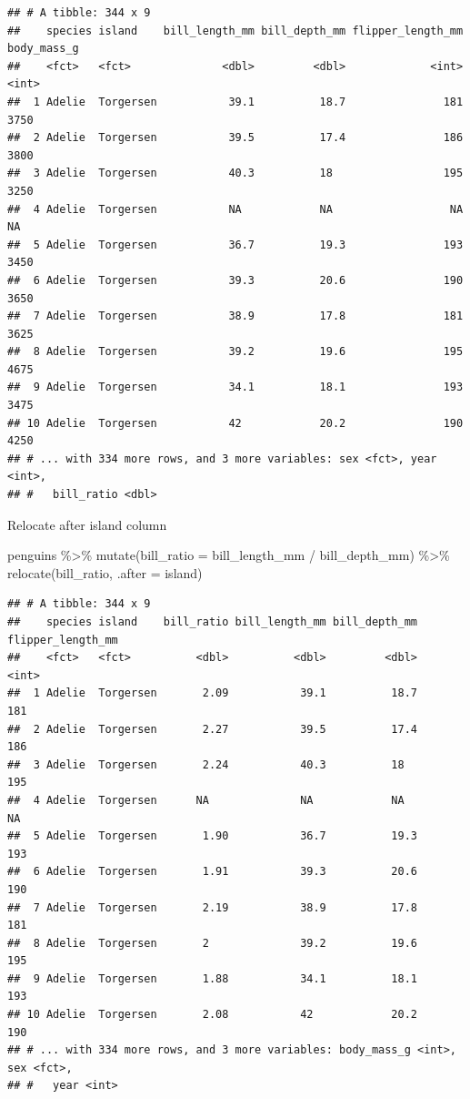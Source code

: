 \documentclass[
]{article}
\newenvironment{Shaded}{\begin{snugshade}}{\end{snugshade}}
\newcommand{\AttributeTok}[1]{\textcolor[rgb]{0.77,0.63,0.00}{#1}}
\newcommand{\FunctionTok}[1]{\textcolor[rgb]{0.00,0.00,0.00}{#1}}
\newcommand{\NormalTok}[1]{#1}
\newcommand{\SpecialCharTok}[1]{\textcolor[rgb]{0.00,0.00,0.00}{#1}}
\begin{document}
\begin{verbatim}
## # A tibble: 344 x 9
##    species island    bill_length_mm bill_depth_mm flipper_length_mm body_mass_g
##    <fct>   <fct>              <dbl>         <dbl>             <int>       <int>
##  1 Adelie  Torgersen           39.1          18.7               181        3750
##  2 Adelie  Torgersen           39.5          17.4               186        3800
##  3 Adelie  Torgersen           40.3          18                 195        3250
##  4 Adelie  Torgersen           NA            NA                  NA          NA
##  5 Adelie  Torgersen           36.7          19.3               193        3450
##  6 Adelie  Torgersen           39.3          20.6               190        3650
##  7 Adelie  Torgersen           38.9          17.8               181        3625
##  8 Adelie  Torgersen           39.2          19.6               195        4675
##  9 Adelie  Torgersen           34.1          18.1               193        3475
## 10 Adelie  Torgersen           42            20.2               190        4250
## # ... with 334 more rows, and 3 more variables: sex <fct>, year <int>,
## #   bill_ratio <dbl>
\end{verbatim}

Relocate after island column

\begin{Shaded}
\begin{Highlighting}[]
\NormalTok{penguins }\SpecialCharTok{\%\textgreater{}\%} 
  \FunctionTok{mutate}\NormalTok{(}\AttributeTok{bill\_ratio =}\NormalTok{ bill\_length\_mm }\SpecialCharTok{/}\NormalTok{ bill\_depth\_mm) }\SpecialCharTok{\%\textgreater{}\%} 
  \FunctionTok{relocate}\NormalTok{(bill\_ratio, }\AttributeTok{.after =}\NormalTok{ island)}
\end{Highlighting}
\end{Shaded}

\begin{verbatim}
## # A tibble: 344 x 9
##    species island    bill_ratio bill_length_mm bill_depth_mm flipper_length_mm
##    <fct>   <fct>          <dbl>          <dbl>         <dbl>             <int>
##  1 Adelie  Torgersen       2.09           39.1          18.7               181
##  2 Adelie  Torgersen       2.27           39.5          17.4               186
##  3 Adelie  Torgersen       2.24           40.3          18                 195
##  4 Adelie  Torgersen      NA              NA            NA                  NA
##  5 Adelie  Torgersen       1.90           36.7          19.3               193
##  6 Adelie  Torgersen       1.91           39.3          20.6               190
##  7 Adelie  Torgersen       2.19           38.9          17.8               181
##  8 Adelie  Torgersen       2              39.2          19.6               195
##  9 Adelie  Torgersen       1.88           34.1          18.1               193
## 10 Adelie  Torgersen       2.08           42            20.2               190
## # ... with 334 more rows, and 3 more variables: body_mass_g <int>, sex <fct>,
## #   year <int>
\end{verbatim}
\end{document}
